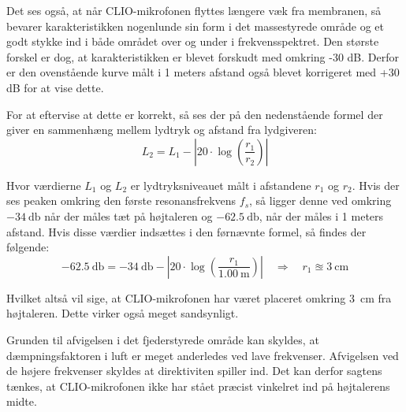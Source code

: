 Det ses også, at når CLIO-mikrofonen flyttes længere væk fra membranen, så bevarer karakteristikken nogenlunde sin form i det massestyrede område og et godt stykke ind i både området over og under i frekvensspektret. Den største forskel er dog, at karakteristikken er blevet forskudt med omkring -30 dB. Derfor er den ovenstående kurve målt i 1 meters afstand også blevet korrigeret med +30 dB for at vise dette. 

For at eftervise at dette er korrekt, så ses der på den nedenstående formel der giver en sammenhæng mellem lydtryk og afstand fra lydgiveren:
\begin{equation}
	L_2 = L_1 - \left| 20 \cdot \log \left( \frac{r_1}{r_2} \right) \right|
\end{equation}

Hvor værdierne $L_1$ og $L_2$ er lydtryksniveauet målt i afstandene $r_1$ og $r_2$. Hvis der ses peaken omkring den første resonansfrekvens $f_s$, så ligger denne ved omkring $-\SI{34}{\decibel}$ når der måles tæt på højtaleren og $-\SI{62.5}{\decibel}$, når der måles i 1 meters afstand. Hvis disse værdier indsættes i den førnævnte formel, så findes der følgende:
\begin{equation}
	\SI{-62.5}{\decibel} = \SI{-34}{\decibel} - \left| 20 \cdot \log \left( \frac{r_1}{\SI{1.00}{\meter}} \right)\right| \quad \Rightarrow \quad r_1 \approxeq \SI{3}{\centi\meter}
\end{equation}

Hvilket altså vil sige, at CLIO-mikrofonen har været placeret omkring \SI{3}{\centi\meter} fra højtaleren. Dette virker også meget sandsynligt.

Grunden til afvigelsen i det fjederstyrede område kan skyldes, at dæmpningsfaktoren i luft er meget anderledes ved lave frekvenser. Afvigelsen ved de højere frekvenser skyldes at direktiviten spiller ind. Det kan derfor sagtens tænkes, at CLIO-mikrofonen ikke har stået præcist vinkelret ind på højtalerens midte. 